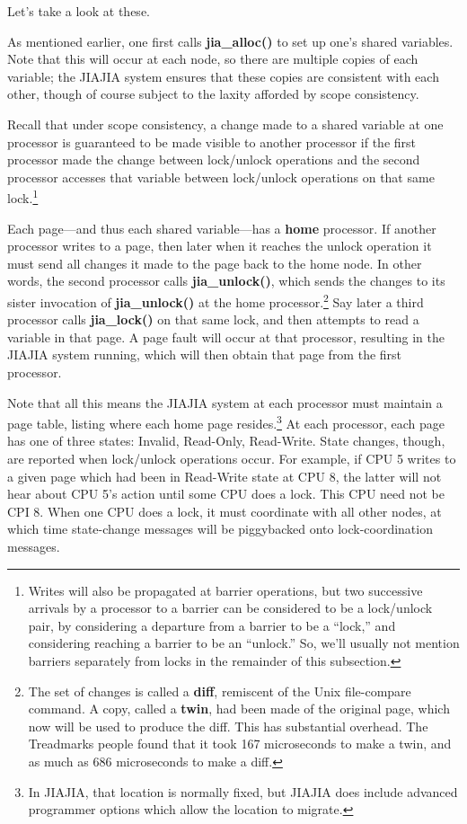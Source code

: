 Let's take a look at these.

As mentioned earlier, one first calls {\bf jia\_alloc()} to set up one's
shared variables.  Note that this will occur at each node, so there are
multiple copies of each variable; the JIAJIA system ensures that these
copies are consistent with each other, though of course subject to the
laxity afforded by scope consistency.

Recall that under scope consistency, a change made to a shared variable
at one processor is guaranteed to be made visible to another processor
if the first processor made the change between lock/unlock operations
and the second processor accesses that variable between lock/unlock
operations on that same lock.\footnote{Writes will also be propagated at
barrier operations, but two successive arrivals by a processor to a
barrier can be considered to be a lock/unlock pair, by considering a
departure from a barrier to be a ``lock,'' and considering reaching a
barrier to be an ``unlock.'' So, we'll usually not mention barriers
separately from locks in the remainder of this subsection.}

Each page---and thus each shared variable---has a {\bf home} processor.
If another processor writes to a page, then later when it reaches the
unlock operation it must send all changes it made to the page back to
the home node.  In other words, the second processor calls {\bf
jia\_unlock()}, which sends the changes to its sister invocation of {\bf
jia\_unlock()} at the home processor.\footnote{The set of changes is
called a {\bf diff}, remiscent of the Unix file-compare command.  A
copy, called a {\bf twin}, had been made of the original page, which now
will be used to produce the diff.  This has substantial overhead.  The
Treadmarks people found that it took 167 microseconds to make a twin,
and as much as 686 microseconds to make a diff.} Say later a third
processor calls {\bf jia\_lock()} on that same lock, and then attempts
to read a variable in that page.  A page fault will occur at that
processor, resulting in the JIAJIA system running, which will then
obtain that page from the first processor.  

Note that all this means the JIAJIA system at each processor must
maintain a page table, listing where each home page resides.\footnote{In
JIAJIA, that location is normally fixed, but JIAJIA does include
advanced programmer options which allow the location to migrate.}  At
each processor, each page has one of three states:  Invalid, Read-Only,
Read-Write.  State changes, though, are reported when lock/unlock
operations occur.  For example, if CPU 5 writes to a given page which
had been in Read-Write state at CPU 8, the latter will not hear about
CPU 5's action until some CPU does a lock.  This CPU need not be
CPI 8.  When one CPU does a lock, it must coordinate with all other
nodes, at which time state-change messages will be piggybacked onto
lock-coordination messages.

